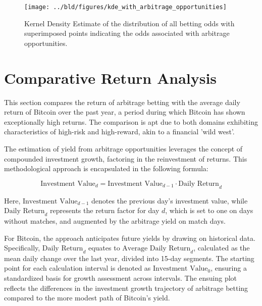 \documentclass[11pt, a4paper, leqno]{article}
\begin{document}
\begin{figure}[H]

    \centering
    \texttt{[image: ../bld/figures/kde\_with\_arbitrage\_opportunities]}

    \caption{ Kernel Density Estimate of the distribution of all betting odds with superimposed points indicating the odds associated with arbitrage opportunities.}
    \label{fig:kde_arbitrage_opportunities}

\end{figure}

\section{Comparative Return Analysis}
\label{sec:comparative_yield_analysis}

This section compares the return of arbitrage betting with the average daily return of Bitcoin over the past year, a period during which Bitcoin has shown exceptionally high returns. The comparison is apt due to both domains exhibiting characteristics of high-risk and high-reward, akin to a financial 'wild west'.

The estimation of yield from arbitrage opportunities leverages the concept of compounded investment growth, factoring in the reinvestment of returns. This methodological approach is encapsulated in the following formula:

\begin{equation}
    \text{Investment Value}_{d} = \text{Investment Value}_{d-1} \cdot \text{Daily Return}_{d}
\end{equation}

Here, \(\text{Investment Value}_{d-1}\) denotes the previous day's investment value, while \(\text{Daily Return}_{d}\) represents the return factor for day \(d\), which is set to one on days without matches, and augmented by the arbitrage yield on match days.

For Bitcoin, the approach anticipates future yields by drawing on historical data. Specifically, \(\text{Daily Return}_{d}\) equates to \(\text{Average Daily Return}_{d}\), calculated as the mean daily change over the last year, divided into 15-day segments. The starting point for each calculation interval is denoted as \(\text{Investment Value}_{0}\), ensuring a standardized basis for growth assessment across intervals.
The ensuing plot reflects the differences in the investment growth trajectory of arbitrage betting compared to the more modest path of Bitcoin's yield.
\end{document}
